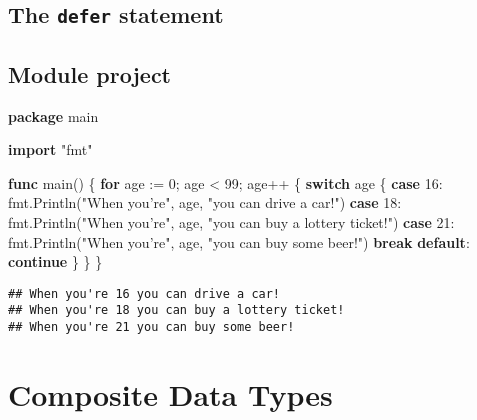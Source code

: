 \documentclass[]{book}
\newenvironment{Shaded}{\begin{snugshade}}{\end{snugshade}}
\newcommand{\DecValTok}[1]{\textcolor[rgb]{0.00,0.00,0.81}{#1}}
\newcommand{\KeywordTok}[1]{\textcolor[rgb]{0.13,0.29,0.53}{\textbf{#1}}}
\newcommand{\NormalTok}[1]{#1}
\newcommand{\StringTok}[1]{\textcolor[rgb]{0.31,0.60,0.02}{#1}}
\begin{document}
\hypertarget{the-defer-statement}{%
\section{\texorpdfstring{The \texttt{defer} statement}{The defer statement}}\label{the-defer-statement}}

\hypertarget{module-project-1}{%
\section*{Module project}\label{module-project-1}}

\begin{Shaded}
\begin{Highlighting}[]
\KeywordTok{package}\NormalTok{ main}

\KeywordTok{import} \StringTok{"fmt"}

\KeywordTok{func}\NormalTok{ main() \{}
    \KeywordTok{for}\NormalTok{ age := }\DecValTok{0}\NormalTok{; age < }\DecValTok{99}\NormalTok{; age++ \{}
        \KeywordTok{switch}\NormalTok{ age \{}
        \KeywordTok{case} \DecValTok{16}\NormalTok{:}
\NormalTok{            fmt.Println(}\StringTok{"When you're"}\NormalTok{, age, }\StringTok{"you can drive a car!"}\NormalTok{)}
        \KeywordTok{case} \DecValTok{18}\NormalTok{:}
\NormalTok{            fmt.Println(}\StringTok{"When you're"}\NormalTok{, age, }\StringTok{"you can buy a lottery ticket!"}\NormalTok{)}
        \KeywordTok{case} \DecValTok{21}\NormalTok{:}
\NormalTok{            fmt.Println(}\StringTok{"When you're"}\NormalTok{, age, }\StringTok{"you can buy some beer!"}\NormalTok{)}
            \KeywordTok{break}
        \KeywordTok{default}\NormalTok{:}
            \KeywordTok{continue}
\NormalTok{        \}}
\NormalTok{    \}}
\NormalTok{\}}
\end{Highlighting}
\end{Shaded}

\begin{verbatim}
## When you're 16 you can drive a car!
## When you're 18 you can buy a lottery ticket!
## When you're 21 you can buy some beer!
\end{verbatim}

\hypertarget{composite-data-types}{%
\chapter{Composite Data Types}\label{composite-data-types}}
\end{document}
